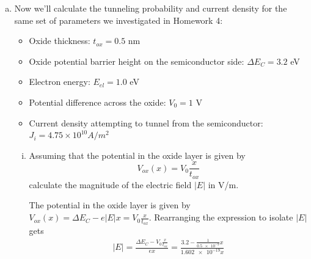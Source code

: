 \documentclass[10pt,letterpaper]{article}
\begin{document}
\begin{enumerate}
\begin{enumerate}[a)]
\begin{enumerate}[i)]
\item Evaluate your integral in part a.i) to obtain an analytical expression for the tunneling probability through the trapezoidal barrier. Leave your answer in terms of $x_{1}$; you will determine a value for $x_{1}$ later.

\color{violet}
Given that $x_{0} = 0$, the analytical expression for the tunneling probability is
\begin{gather*}
T = e^{-\frac{2^{3/2}e^{-1}(m(e|E|L + E_{el} - E_{C}))^{3/2}}{\hbar|E|m}}
\end{gather*}
Setting $\kappa = \frac{2^{3/2}e^{-1}(m(e|E|L + E_{el} - E_{C}))^{3/2}}{2\hbar|E|m}$ to get $T = e^{-2\kappa x_{1}}$, or
\begin{gather*}
T = \frac{1}{1 +  \frac{V_{0}^{2}\sinh^{2}(\kappa x_{1})}{4E_{el}(E_{el} - \Delta E_{C} + e|E|x)}}
\end{gather*}
\color{black}

\end{enumerate}

\item Now we’ll calculate the tunneling probability and current density for the same set of parameters we investigated in Homework 4:

\begin{itemize}

\item Oxide thickness: $t_{ox} = 0.5$ nm 

\item Oxide potential barrier height on the semiconductor side: $\Delta E_{C} = 3.2$ eV

\item Electron energy: $E_{el} = 1.0$ eV

\item Potential difference across the oxide: $V_{0} = 1$ V

\item Current density attempting to tunnel from the semiconductor: $J_{i} = 4.75 \times 10^{10} A/m^{2}$

\end{itemize}

\begin{enumerate}[i)]

\item Assuming that the potential in the oxide layer is given by
$$V_{ox}(x) = V_{0}\frac{x}{t_{ox}}$$
calculate the magnitude of the electric field $|E|$ in V/m. 

\color{violet}
The potential in the oxide layer is given by $V_{ox}(x) = \Delta E_{C} - e|E|x = V_{0}\frac{x}{t_{ox}}$. Rearranging the expression to isolate $|E|$ gets
\begin{gather*}
|E| = \frac{\Delta E_{C} - V_{0}\frac{x}{t_{ox}}}{ex} = \frac{3.2 - \frac{1}{\num{0.5e-9}}x}{\num{1.602e-19}x}
\end{gather*}
\color{black}


\end{enumerate}
\end{enumerate}
\end{enumerate}
\end{document}
